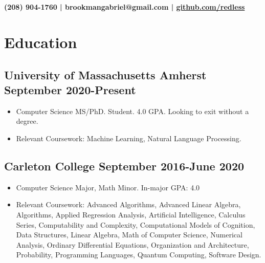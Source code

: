 \documentclass[12pt]{article}
\begin{document}
{\selectfont

\section*{}
\begin{center}\textbf{(208) 904-1760 | brookmangabriel@gmail.com | \href{https://github.com/redless}{github.com/redless}}\end{center}
\section*{Education}

\subsection*{University of Massachusetts Amherst \hfill September 2020-Present} 
  \begin{itemize}

  \item Computer Science MS/PhD. Student. 4.0 GPA. Looking to exit without a degree.
\item
  Relevant Coursework: Machine Learning, Natural Language Processing.

\end{itemize}

  \subsection*{Carleton College \hfill September 2016-June 2020} 
  \begin{itemize}

  \item Computer Science Major, Math Minor. In-major GPA: 4.0
\item
  Relevant Coursework: Advanced Algorithms, Advanced Linear Algebra, Algorithms, Applied Regression Analysis, Artificial Intelligence, Calculus Series, Computability and Complexity, Computational Models of Cognition, Data Structures, Linear Algebra, Math of Computer Science, Numerical Analysis, Ordinary Differential Equations, Organization and
  Architecture, Probability, Programming Languages, Quantum Computing, Software Design.
  


\end{itemize}}
\end{document}
